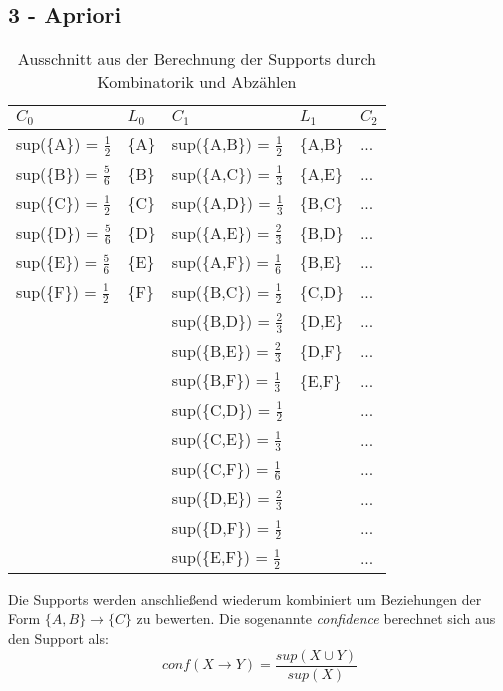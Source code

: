 \subsection*{3 - Apriori}
\def\arraystretch{1.5}%
\begin{table}[h]
\centering
\caption{Ausschnitt aus der Berechnung der Supports durch Kombinatorik und Abzählen}
\begin{tabular}{l | l | l | l | l}
$C_0$ & $L_0$ & $C_1$ & $L_1$ & $C_2$ \\ \hline
sup(\{A\}) = $\frac{1}{2}$ & \{A\} & sup(\{A,B\}) = $\frac{1}{2}$ & \{A,B\} & ... \\
sup(\{B\}) = $\frac{5}{6}$ & \{B\} & sup(\{A,C\}) = $\frac{1}{3}$ & \{A,E\} & ... \\
sup(\{C\}) = $\frac{1}{2}$ & \{C\} & sup(\{A,D\}) = $\frac{1}{3}$ & \{B,C\} & ... \\
sup(\{D\}) = $\frac{5}{6}$ & \{D\} & sup(\{A,E\}) = $\frac{2}{3}$ & \{B,D\} & ... \\
sup(\{E\}) = $\frac{5}{6}$ & \{E\} & sup(\{A,F\}) = $\frac{1}{6}$ & \{B,E\} & ... \\
sup(\{F\}) = $\frac{1}{2}$ & \{F\} & sup(\{B,C\}) = $\frac{1}{2}$ & \{C,D\} & ... \\
& & sup(\{B,D\}) = $\frac{2}{3}$ & \{D,E\} & ... \\
& & sup(\{B,E\}) = $\frac{2}{3}$ & \{D,F\} & ... \\
& & sup(\{B,F\}) = $\frac{1}{3}$ & \{E,F\} & ... \\
& & sup(\{C,D\}) = $\frac{1}{2}$ & & ... \\
& & sup(\{C,E\}) = $\frac{1}{3}$ & & ... \\
& & sup(\{C,F\}) = $\frac{1}{6}$ & & ... \\
& & sup(\{D,E\}) = $\frac{2}{3}$ & & ... \\
& & sup(\{D,F\}) = $\frac{1}{2}$ & & ... \\
& & sup(\{E,F\}) = $\frac{1}{2}$ & & ... \\
\end{tabular}
\end{table}

Die Supports werden anschließend wiederum kombiniert um Beziehungen der Form $\{A,B\} \rightarrow \{C\}$ zu bewerten. Die sogenannte \textit{confidence} berechnet sich aus den Support als:
\begin{equation}
conf(X \rightarrow Y) = \frac{sup(X \cup Y)}{sup(X)}
\end{equation}

